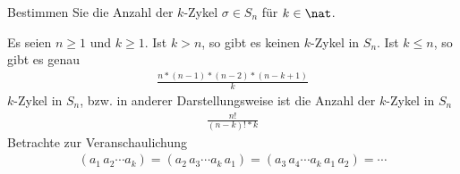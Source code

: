 \begin{uebungsblatt}
	\begin{uebung}
		Bestimmen Sie die Anzahl der $k$-Zykel $\sigma \in S_n$ für $k \in \nat$.
	\end{uebung}
	\begin{loesung}
		Es seien $n \geq 1$ und $k \geq 1$. Ist $k > n$, so gibt es keinen $k$-Zykel in $S_n$. Ist $k \leq n$, so gibt es genau
		\begin{align*}
			\frac{n*(n-1)*(n-2) * (n-k+1)}{k}
		\end{align*}
		$k$-Zykel in $S_n$, bzw. in anderer Darstellungsweise ist die Anzahl der $k$-Zykel in $S_n$
		\begin{align*}
			\frac{n!}{(n-k)! * k}
		\end{align*}
		Betrachte zur Veranschaulichung 
		\begin{align*}
			(a_1 \, a_2 \cdots a_k) = (a_2 \, a_3 \cdots a_k \, a_1) = (a_3 \, a_4 \cdots a_k \, a_1 \, a_2) = \cdots
		\end{align*}
	\end{loesung}


\end{uebungsblatt}
